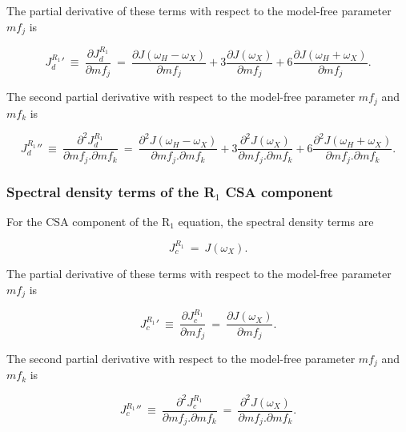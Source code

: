 \noindent The partial derivative of these terms with respect to the model-free parameter $mf_j$ is

\begin{equation}
    {J_d^{R_1}}' \ \equiv \ \frac{\partial J_d^{R_1}}{\partial mf_j}
        \ = \ \frac{\partial J(\omega_H - \omega_X)}{\partial mf_j}
        + 3 \frac{\partial J(\omega_X)}{\partial mf_j}
        + 6 \frac{\partial J(\omega_H + \omega_X)}{\partial mf_j}.  \label{eq: J terms: JR1d'}
\end{equation}

\noindent The second partial derivative with respect to the model-free parameter $mf_j$ and $mf_k$ is

\begin{equation}
    {J_d^{R_1}}'' \ \equiv \ \frac{\partial^2 J_d^{R_1}}{\partial mf_j . \partial mf_k}
        \ = \ \frac{\partial^2 J(\omega_H - \omega_X)}{\partial mf_j . \partial mf_k}
        + 3 \frac{\partial^2 J(\omega_X)}{\partial mf_j . \partial mf_k}
        + 6 \frac{\partial^2 J(\omega_H + \omega_X)}{\partial mf_j . \partial mf_k}.  \label{eq: J terms: JR1d"}
\end{equation}


\subsubsection{Spectral density terms of the R$_1$ CSA component}

For the CSA component of the R$_1$ equation, the spectral density terms are

\begin{equation}
    J_c^{R_1} \ = \ J(\omega_X).  \label{eq: J terms: JR1c}
\end{equation}

\noindent The partial derivative of these terms with respect to the model-free parameter $mf_j$ is

\begin{equation}
    {J_c^{R_1}}' \ \equiv \ \frac{\partial J_c^{R_1}}{\partial mf_j}
        \ = \ \frac{\partial J(\omega_X)}{\partial mf_j}.  \label{eq: J terms: JR1c'}
\end{equation}

\noindent The second partial derivative with respect to the model-free parameter $mf_j$ and $mf_k$ is

\begin{equation}
    {J_c^{R_1}}'' \ \equiv \ \frac{\partial^2 J_c^{R_1}}{\partial mf_j . \partial mf_k}
        \ = \ \frac{\partial^2 J(\omega_X)}{\partial mf_j . \partial mf_k}.  \label{eq: J terms: JR1c"}
\end{equation}


